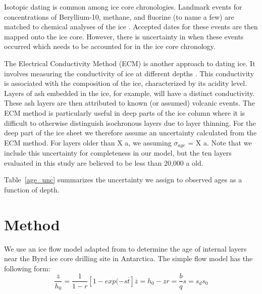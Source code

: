 \documentclass[draft,jgrga]{agutex}
\begin{document}
\begin{article}
Isotopic dating is common among ice core chronologies. Landmark events for concentrations of Beryllium-10, methane, and fluorine (to name a few) are matched to chemical analyses of the ice \citep{schwander2001}. Accepted dates for these events are then mapped onto the ice core. However, there is uncertainty in when these events occurred which needs to be accounted for in the ice core chronology.


The Electrical Conductivity Method (ECM) is another approach to dating ice. It involves measuring the conductivity of ice at different depths \citep{hammer1994}. This conductivity is associated with the composition of the ice, characterized by its acidity level. Layers of ash embedded in the ice, for example, will have a distinct conductivity. These ash layers are then attributed to known (or assumed) volcanic events. The ECM method is particularly useful in deep parts of the ice column where it is difficult to otherwise distinguish isochronous layers due to layer thinning. For the deep part of the ice sheet we therefore assume an uncertainty calculated from the ECM method. For layers older than X a, we assuming $\sigma_{age}$ = X a. Note that we include this uncertainty for completeness in our model, but the ten layers evaluated in this study are believed to be less than 20,000 a old. 

Table~\ref{age_unc} summarizes the uncertainty we assign to observed ages as a function of depth.





\section{Method}\label{method}

We use an ice flow model adapted from \citet{morland2009} to determine the age of internal layers near the Byrd ice core drilling site in Antarctica.  The simple flow model has the following form:
\begin{equation}
\frac{\overline{z}}{h_0} = \frac{1}{1-r} [1 - exp(-s \overline{t}]
\overline{z} = h_0 - z
r = \frac{b}{q}
s = s_ds_0
\end{equation}


\end{article}
\end{document}
